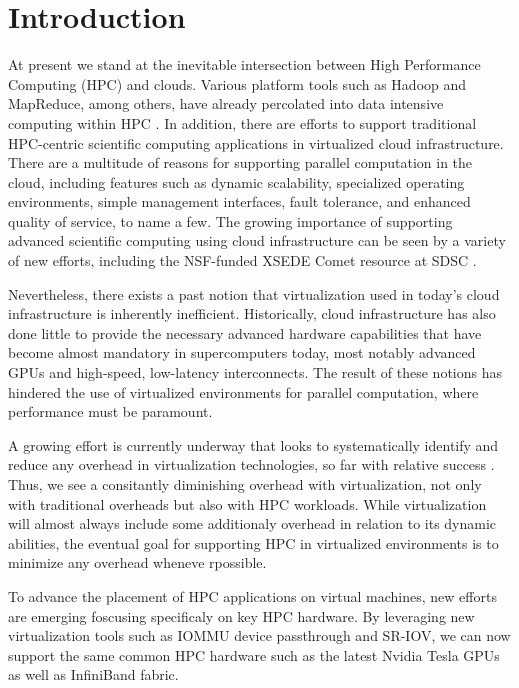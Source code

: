 \documentclass[times,10pt,twocolumn,conference]{IEEEtran}
\begin{document}
\section{Introduction}

At present we stand at the inevitable intersection between High Performance Computing (HPC) and clouds. Various platform tools such as Hadoop and MapReduce, among others, have already percolated into data intensive computing within HPC \cite{jha2014apache}.  In addition, there are efforts to support traditional HPC-centric scientific computing applications in virtualized cloud infrastructure.  There are a multitude of reasons for supporting parallel computation in the cloud\cite{Armbrust2010}, including features such as dynamic scalability, specialized operating environments, simple management interfaces, fault tolerance, and enhanced quality of service, to name a few. The growing importance of supporting advanced scientific computing using cloud infrastructure can be seen by a variety of new efforts, including the NSF-funded XSEDE Comet resource at SDSC \cite{sdsc2014comet}.  

Nevertheless, there exists a past notion that virtualization used in today's cloud infrastructure is inherently inefficient.  Historically, cloud infrastructure has also done little to provide the necessary advanced hardware capabilities that have become almost mandatory in supercomputers today, most notably advanced GPUs and high-speed, low-latency interconnects.  The result of these notions has hindered the use of virtualized environments for parallel computation, where performance must be paramount.

A growing effort is currently underway that looks to systematically identify and reduce any overhead in virtualization technologies, so far with relative success \cite{Younge2011cloud, Lukoviak}.  Thus, we see a consitantly diminishing overhead with virtualization, not only with traditional overheads \cite{} but also with HPC workloads.  While virtualization will almost always include some additionaly overhead in relation to its dynamic abilities, the eventual goal for supporting HPC in virtualized environments  is to minimize any overhead wheneve rpossible.
 
To advance the placement of HPC applications on virtual machines, new efforts are emerging foscusing specificaly on key HPC hardware. By leveraging new virtualization tools such as IOMMU device passthrough and SR-IOV, we can now support the same common HPC hardware such as the latest Nvidia Tesla GPUs \cite{younge2014}  as well as InfiniBand fabric\cite{panda}.  
\end{document}
